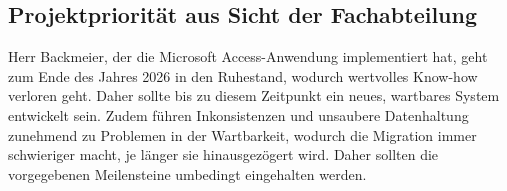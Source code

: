 \documentclass[a4paper, 12pt]{article}
\begin{document}
\vspace{1cm}

\subsection{Projektpriorität aus Sicht der Fachabteilung}
Herr Backmeier, der die Microsoft Access-Anwendung implementiert hat, geht zum Ende des Jahres 2026 in den Ruhestand, wodurch wertvolles Know-how verloren geht. Daher sollte bis zu diesem Zeitpunkt ein neues, wartbares System entwickelt sein. Zudem führen Inkonsistenzen und unsaubere Datenhaltung zunehmend zu Problemen in der Wartbarkeit, wodurch die Migration immer schwieriger macht, je länger sie hinausgezögert wird. Daher sollten die vorgegebenen Meilensteine umbedingt eingehalten werden.
\end{document}
